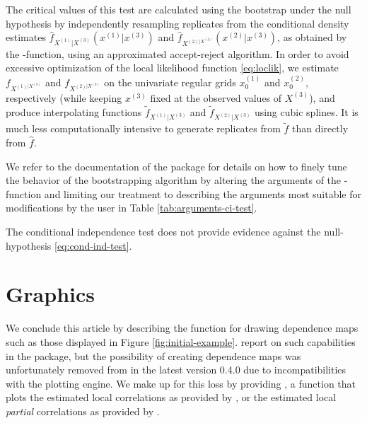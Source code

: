 The critical values of this test are calculated using the bootstrap under the null hypothesis by independently resampling replicates from
the conditional density estimates \(\widehat f_{X^{\left(1\right)}|X^{\left(3\right)}}\left(x^{\left(1\right)}|x^{\left(3\right)}\right)\) and \(\widehat f_{X^{\left(2\right)|X^{\left(3\right)}}}\left(x^{\left(2\right)}|x^{\left(3\right)}\right)\), as obtained by the -function, using an approximated accept-reject algorithm. In order to avoid excessive optimization of the local likelihood function \eqref{eq:loclik}, we estimate \(f_{X^{\left(1\right)|X^{\left(3\right)}}}\) and \(f_{X^{\left(2\right)|X^{\left(3\right)}}}\) on the univariate regular grids \(x_0^{\left(1\right)}\) and \(x_0^{\left(2\right)}\), respectively (while keeping \(x^{\left(3\right)}\) fixed at the observed values of \(X^{\left(3\right)}\)), and produce interpolating functions \(\tilde f_{X^{\left(1\right)}|X^{\left(3\right)}}\) and \(\tilde f_{X^{\left(2\right)}|X^{\left(3\right)}}\) using cubic splines. It is much less computationally intensive to generate replicates from \(\tilde f\) than directly from \(\widehat f\).

We refer to the documentation of the  package for details on how to finely tune the behavior of the bootstrapping algorithm by altering the arguments of the -function and limiting our treatment to describing the arguments most suitable for modifications by the user in Table \ref{tab:arguments-ci-test}.

The conditional independence test does not provide evidence against the null-hypothesis \eqref{eq:cond-ind-test}.

\section{Graphics}\label{chap:graphics}

We conclude this article by describing the  function for drawing dependence maps such as those displayed in Figure \ref{fig:initial-example}. \citet{bere:klep:tjos:2014} report on such capabilities in the  package, but the possibility of creating dependence maps was unfortunately removed from  in the latest version 0.4.0 due to incompatibilities with the  \citep{wick:2016} plotting engine. We make up for this loss by providing , a function that plots the estimated local correlations as provided by , or the estimated local \emph{partial} correlations as provided by .

